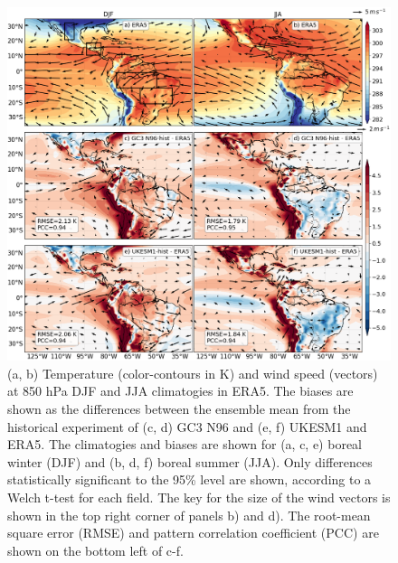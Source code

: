  \begin{figure}[t!]
\centering
 \includegraphics[width=\linewidth]{figures/fig1p2_f1a.png}
\caption[Temperature and SLP climatologies in UKESM1 and HadGEM3]{ (a, b) Temperature (color-contours in K) and wind speed (vectors) at 850 hPa DJF and JJA climatogies in ERA5. The biases are shown as the differences between the ensemble mean from the historical experiment of (c, d) GC3 N96 and  (e, f) UKESM1 and ERA5.
The climatogies and biases are shown for (a, c, e) boreal winter (DJF) and (b, d, f) boreal summer (JJA). Only differences statistically significant to the 95\% level are shown, according to a Welch t-test for each field. The key for the size of the wind vectors is shown in the top right corner of panels b) and d). The root-mean square error (RMSE) and pattern correlation coefficient (PCC) are shown on the bottom left of c-f.}
\label{fig:1}
\end{figure}

